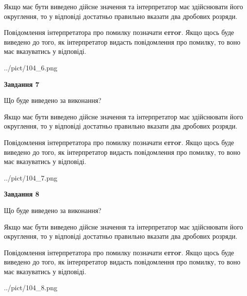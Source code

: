 \documentclass[12pt, ukrainian]{article}
\begin{document}
{\begin {Large}
Якщо має бути виведено дійсне значення та інтерпретатор має здійснювати його округлення, 
то у відповіді достатньо правильно вказати два дробових розряди.

Повідомлення інтерпретатора про помилку позначати \textbf{error}.
Якщо щось буде виведено до того, як інтерпретатор видасть повідомлення про помилку, 
то воно має вказуватись у відповіді. \par

\begin{center}
	{../pict/104_6.png}
\end{center}
\newpage

{\begin {center}\textbf{Завдання 7}\end {center}}\par
Що буде виведено за виконання? \par

Якщо має бути виведено дійсне значення та інтерпретатор має здійснювати його округлення, 
то у відповіді достатньо правильно вказати два дробових розряди.

Повідомлення інтерпретатора про помилку позначати \textbf{error}.
Якщо щось буде виведено до того, як інтерпретатор видасть повідомлення про помилку, 
то воно має вказуватись у відповіді. \par

\begin{center}
	{../pict/104_7.png}
\end{center}
\newpage

{\begin {center}\textbf{Завдання 8}\end {center}}\par
Що буде виведено за виконання? \par

Якщо має бути виведено дійсне значення та інтерпретатор має здійснювати його округлення, 
то у відповіді достатньо правильно вказати два дробових розряди.

Повідомлення інтерпретатора про помилку позначати \textbf{error}.
Якщо щось буде виведено до того, як інтерпретатор видасть повідомлення про помилку, 
то воно має вказуватись у відповіді. \par

\begin{center}
	{../pict/104_8.png}
\end{center}
\newpage


\end{Large}}
\end{document}
